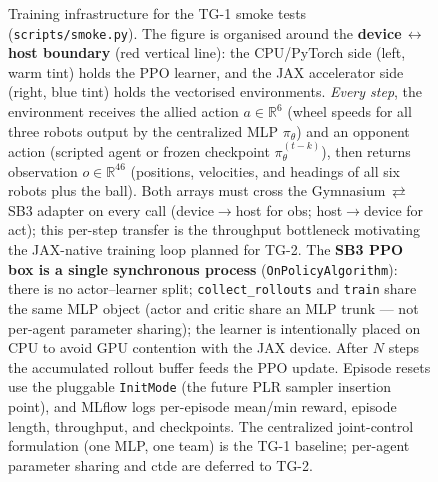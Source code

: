 \begin{figure}[ht]
{\begin{tikzpicture}
    \end{tikzpicture}%
    }
    \caption{Training infrastructure for the TG-1 smoke tests
    (\texttt{scripts/smoke.py}).  The figure is organised around the
    \textbf{device\,$\leftrightarrow$\,host boundary} (red vertical line):
    the CPU/PyTorch side (left, warm tint) holds the PPO learner, and the
    JAX accelerator side (right, blue tint) holds the vectorised
    environments.  \emph{Every step}, the environment receives the allied
    action $a\!\in\!\mathbb{R}^{6}$ (wheel speeds for all three robots
    output by the centralized MLP $\pi_\theta$) and an opponent action
    (scripted agent or frozen checkpoint $\pi^{(t-k)}_\theta$), then
    returns observation $o\!\in\!\mathbb{R}^{46}$ (positions, velocities,
    and headings of all six robots plus the ball).  Both arrays must cross
    the Gymnasium\,$\rightleftarrows$\,SB3 adapter on every call
    (device$\to$host for obs; host$\to$device for act); this per-step
    transfer is the throughput bottleneck motivating the JAX-native
    training loop planned for TG-2.  The \textbf{SB3 PPO box is a single
    synchronous process} (\texttt{OnPolicyAlgorithm}): there is no
    actor--learner split; \texttt{collect\_rollouts} and \texttt{train}
    share the same MLP object (actor and critic share an MLP trunk ---
    not per-agent parameter sharing); the learner is intentionally placed
    on CPU to avoid GPU contention with the JAX device.  After $N$ steps
    the accumulated rollout buffer feeds the PPO update.  Episode resets
    use the pluggable \texttt{InitMode} (the future PLR sampler insertion
    point), and MLflow logs per-episode mean/min reward, episode length,
    throughput, and checkpoints.  The centralized joint-control
    formulation (one MLP, one team) is the TG-1 baseline;
    per-agent parameter sharing and \gls{ctde} are deferred to TG-2.}
    \label{fig:training_infra}
\end{figure}
